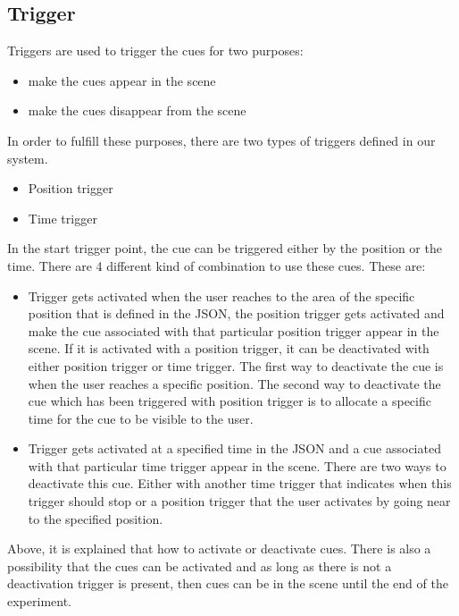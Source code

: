 \documentclass[conference]{IEEEtran}
\begin{document}
\subsection{Trigger}

Triggers are used to trigger the cues for two purposes:
\begin{itemize}
    \item make the cues appear in the scene 
    \item make the cues disappear from the scene
\end{itemize}

In order to fulfill these purposes, there are two types of triggers defined in our system. 
\begin{itemize}
    \item Position trigger
    \item Time trigger
\end{itemize}

In the start trigger point, the cue can be triggered either by the position or the time. There are 4 different kind of combination to use these cues. These are:
\begin{itemize}
    \item Trigger gets activated when the user reaches to the area of the specific position that is defined in the JSON, the position trigger gets activated and make the cue associated with that particular position trigger appear in the scene. If it is activated with a position trigger, it can be deactivated with either position trigger or time trigger. The first way to deactivate the cue is when the user reaches a specific position. The second way to deactivate the cue which has been triggered with position trigger is to allocate a specific time for the cue to be visible to the user. 
    \item Trigger gets activated at a specified time in the JSON and a cue associated with that particular time trigger appear in the scene. There are two ways to deactivate this cue. Either with another time trigger that indicates when this trigger should stop or a position trigger that the user activates by going near to the specified position.
\end{itemize}
 
Above, it is explained that how to activate or deactivate cues. There is also a possibility that the cues can be activated and as long as there is not a deactivation trigger is present, then cues can be in the scene until the end of the experiment. 
\end{document}
